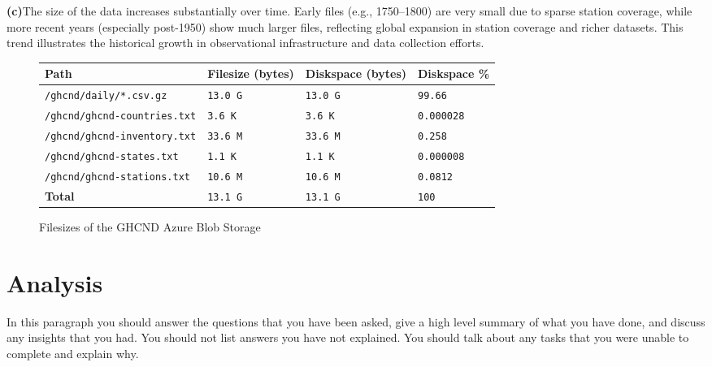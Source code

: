 \documentclass[11pt]{article}
\begin{document}
\newpage
\textbf{(c)}The size of the data increases substantially over time. Early files (e.g., 1750–1800) are very small due to sparse station coverage, while more recent years (especially post-1950) show much larger files, reflecting global expansion in station coverage and richer datasets. This trend illustrates the historical growth in observational infrastructure and data collection efforts.

\begin{figure}[htbp]
    \centering
    \begin{minipage}{0.9\textwidth}
    \centering
    \begin{tabular}{@{}L{0.40\textwidth} R{0.20\textwidth} R{0.20\textwidth} R{0.20\textwidth}@{}}
        \toprule
        \textbf{Path} & \textbf{Filesize (bytes)} & \textbf{Diskspace (bytes)} & \textbf{Diskspace \%} \\
        \midrule
        \texttt{/ghcnd/daily/*.csv.gz}      & \texttt{13.0 G}  & \texttt{13.0 G}  & \texttt{99.66} \\
        \texttt{/ghcnd/ghcnd-countries.txt} & \texttt{3.6 K}   & \texttt{3.6 K}   & \texttt{0.000028} \\
        \texttt{/ghcnd/ghcnd-inventory.txt} & \texttt{33.6 M}  & \texttt{33.6 M}  & \texttt{0.258} \\
        \texttt{/ghcnd/ghcnd-states.txt}    & \texttt{1.1 K}   & \texttt{1.1 K}   & \texttt{0.000008} \\
        \texttt{/ghcnd/ghcnd-stations.txt}  & \texttt{10.6 M}  & \texttt{10.6 M}  & \texttt{0.0812} \\
        \midrule
        \textbf{Total} & \texttt{13.1 G} & \texttt{13.1 G} & \texttt{100} \\
        \bottomrule
    \end{tabular}
    \caption{Filesizes of the GHCND Azure Blob Storage}
    \label{fig-azure-size}
    \end{minipage}
\end{figure}

\section{Analysis}

In this paragraph you should answer the questions that you have been asked, give a high level summary of what you have done, and discuss any insights that you had. You should not list answers you have not explained. You should talk about any tasks that you were unable to complete and explain why.
\end{document}
